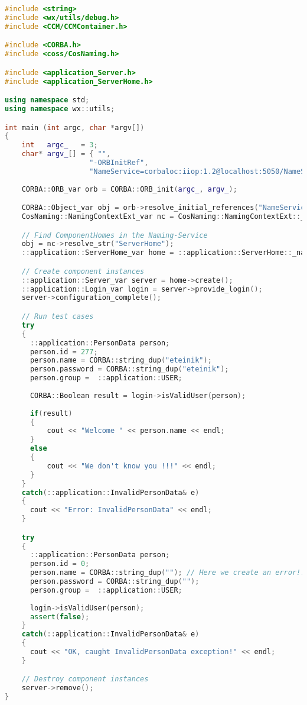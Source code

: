 \begin{footnotesize}
\begin{lstlisting}[language=C++]
#include <string>
#include <wx/utils/debug.h>
#include <CCM/CCMContainer.h>

#include <CORBA.h>
#include <coss/CosNaming.h>

#include <application_Server.h>
#include <application_ServerHome.h>

using namespace std;
using namespace wx::utils;

int main (int argc, char *argv[])
{
    int   argc_   = 3;
    char* argv_[] = { "", 
                    "-ORBInitRef", 
                    "NameService=corbaloc:iiop:1.2@localhost:5050/NameService"};
 
    CORBA::ORB_var orb = CORBA::ORB_init(argc_, argv_);

    CORBA::Object_var obj = orb->resolve_initial_references("NameService");
    CosNaming::NamingContextExt_var nc = CosNaming::NamingContextExt::_narrow(obj);

    // Find ComponentHomes in the Naming-Service
    obj = nc->resolve_str("ServerHome");
    ::application::ServerHome_var home = ::application::ServerHome::_narrow(obj);

    // Create component instances
    ::application::Server_var server = home->create();
    ::application::Login_var login = server->provide_login();
    server->configuration_complete();

	// Run test cases
    try 
    {
      ::application::PersonData person;
      person.id = 277;
      person.name = CORBA::string_dup("eteinik");
      person.password = CORBA::string_dup("eteinik");   
      person.group =  ::application::USER;       
      
      CORBA::Boolean result = login->isValidUser(person);
      
      if(result) 
      {
          cout << "Welcome " << person.name << endl;
      }
      else 
      {
          cout << "We don't know you !!!" << endl;
      }
    }
    catch(::application::InvalidPersonData& e)
    {
      cout << "Error: InvalidPersonData" << endl;	
    }

    try 
    {
      ::application::PersonData person;
      person.id = 0;
      person.name = CORBA::string_dup(""); // Here we create an error!!!
      person.password = CORBA::string_dup("");   
      person.group =  ::application::USER;       
      
      login->isValidUser(person);
      assert(false); 
    }
    catch(::application::InvalidPersonData& e)
    {
      cout << "OK, caught InvalidPersonData exception!" << endl;	
    }

    // Destroy component instances
    server->remove();
}
\end{lstlisting}
\end{footnotesize}

